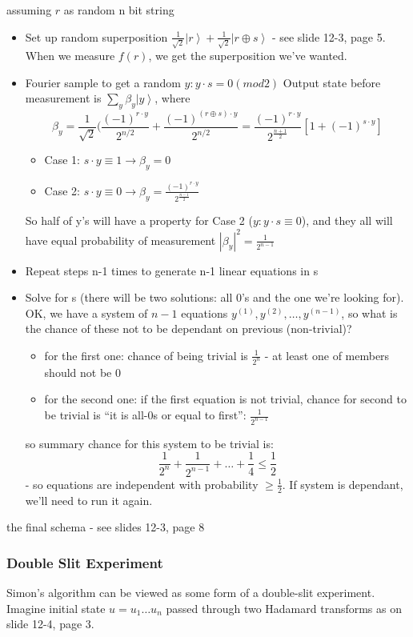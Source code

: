 \documentclass{scrartcl}
\newcommand{\ket}[1]{\left| #1 \right>} %
\newcommand{\half}{\frac12} %
\newcommand{\hqrt}{\frac1{\sqrt2}} %
\begin{document}
assuming $r$ as random n bit string
\begin{itemize}
\item Set up random superposition $\hqrt \ket r + \hqrt \ket{r \oplus s}$ - see
  slide 12-3, page 5. When we measure $f(r)$, we get the superposition we've
  wanted.
\item Fourier sample to get a random $y: y \cdot s = 0 (mod2)$ Output state
  before measurement is $\sum \limits_y \beta_y \ket y$, where
$$\beta_y = \hqrt (\frac{(-1)^{r \cdot y}}{2^{n/2}} + \frac{(-1)^{(r \oplus s)
    \cdot y}}{2^{n/2}} = \frac{(-1)^{r\cdot y}}{2^{\frac{n+1}2}} \left[ 1 +
  (-1)^{s\cdot y}\right] $$
\begin{itemize}
\item Case 1: $s \cdot y \equiv 1 \to \beta_y = 0$
\item Case 2: $s \cdot y \equiv 0 \to \beta_y = \frac{(-1)^{r \cdot
      y}}{2^{\frac{n-1}2}}$
\end{itemize}
So half of y's will have a property for Case 2 ($y: y \cdot s \equiv 0$), and
they all will have equal probability of measurement $|\beta_y|^2 =
\frac1{2^{n-1}}$
\item Repeat steps n-1 times to generate n-1 linear equations in s
\item Solve for s (there will be two solutions: all 0's and the one we're
  looking for). OK, we have a system of $n-1$ equations $y^{(1)}, y^{(2)},
  \dots, y^{(n-1)}$, so what is the chance of these not to be dependant on
  previous (non-trivial)?
  \begin{itemize}
  \item for the first one: chance of being trivial is $\frac1{2^n}$ - at least
    one of members should not be 0
  \item for the second one: if the first equation is not trivial, chance for
    second to be trivial is ``it is all-0s or equal to first'':
    $\frac1{2^{n-1}}$
  \end{itemize}
  so summary chance for this system to be trivial is:
$$\frac1{2^n} + \frac1{2^{n-1}} + \dots + \frac14 \leq \half $$
- so equations are independent with probability $\geq \half$. If system is
dependant, we'll need to run it again.
\end{itemize}
the final schema - see slides 12-3, page 8

\subsubsection{Double Slit Experiment}
\label{sec:DblSlitExp2}
Simon's algorithm can be viewed as some form of a double-slit experiment.
Imagine initial state $u = u_1 \dots u_n$ passed through two Hadamard transforms
as on slide 12-4, page 3.
\end{document}
